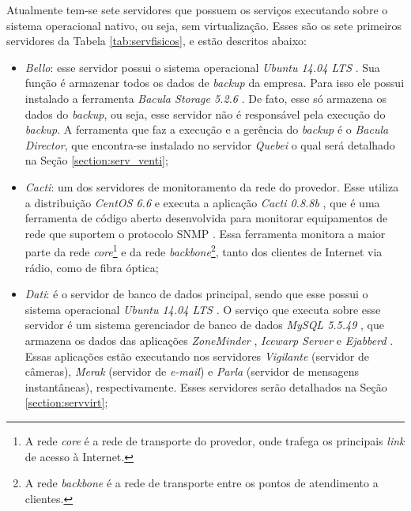 Atualmente tem-se sete servidores que possuem os serviços executando sobre o sistema operacional nativo, ou seja, sem virtualização. 
Esses são os sete primeiros servidores da Tabela \ref{tab:servfisicos}, e estão descritos abaixo:
\begin{itemize}
 \item \textit{Bello}: esse servidor possui o sistema operacional \textit{Ubuntu 14.04 \ac{LTS}} \cite{ubuntu}. Sua função é armazenar todos os 
 dados de \textit{backup} da empresa. Para isso ele possui instalado a ferramenta \textit{Bacula Storage 5.2.6} \cite{bacula}. De fato, esse só
 armazena os dados do \textit{backup}, ou seja, esse servidor não é responsável pela execução do \textit{backup}. A ferramenta que faz a execução e
 a gerência do \textit{backup} é o \textit{Bacula Director}, que encontra-se instalado no servidor \textit{Quebei} o qual será detalhado na 
 Seção \ref{section:serv_venti};
 
 \item \textit{Cacti}: um dos servidores de monitoramento da rede do provedor. Esse utiliza a distribuição \textit{CentOS 6.6} \cite{centos} e 
 executa a aplicação \textit{Cacti 0.8.8b} \cite{cacti}, que é uma ferramenta de código aberto desenvolvida para monitorar equipamentos de rede 
 que suportem o protocolo \ac{SNMP} \cite{kurose2006}. Essa ferramenta monitora a maior parte da rede 
 \textit{core}\footnote[1]{A rede \textit{core} é a rede de transporte do provedor, onde trafega os principais \textit{link} de acesso à Internet.} 
 e da rede \textit{backbone}\footnote[2]{A rede \textit{backbone} é a rede de transporte entre os pontos de atendimento a clientes.}, 
 tanto dos clientes de Internet via rádio, como de fibra óptica;
 
 \item \textit{Dati}: é o servidor de banco de dados principal, sendo que esse possui o sistema operacional \textit{Ubuntu 14.04 \ac{LTS}} 
 \cite{ubuntu}. O serviço que executa sobre esse servidor é um sistema gerenciador de banco de dados \textit{MySQL 5.5.49} \cite{mysql}, que 
 armazena os dados das aplicações \textit{ZoneMinder} \cite{zoneminder}, \textit{Icewarp Server} \cite{icewarp} e \textit{Ejabberd} \cite{ejabberd}. 
 Essas aplicações estão executando nos servidores \textit{Vigilante} (servidor de câmeras), \textit{Merak} (servidor de \textit{e-mail}) e 
 \textit{Parla} (servidor de mensagens instantâneas), respectivamente. Esses servidores serão detalhados na Seção \ref{section:servvirt};
 

\end{itemize}
